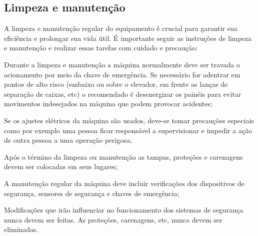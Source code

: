 \newpage
\thispagestyle{fancy}
\vspace*{40 pt}

\subsection{Limpeza e manutenção}

A limpeza e manutenção regular do equipamento é crucial para garantir sua eficiência e prolongar sua vida útil. É importante seguir as instruções de limpeza e manutenção e realizar essas tarefas com cuidado e precaução:

\begin{generalRulesForCleaning}
\item[\ding{\dingNumber}]  Durante a limpeza e manutenção a máquina normalmente deve ser travada o acionamento por meio da chave
de emergência. Se necessário for adentrar em pontos de alto risco (embaixo ou sobre o elevador, em frente as
lanças de separação de caixas, etc) o recomendado é desenergizar os painéis para evitar movimentos indesejados
na máquina que podem provocar acidentes;
\item[\ding{\dingNumber}] Se os ajustes elétricos da máquina são usados, deve-se tomar precauções especiais como por exemplo uma
pessoa ficar responsável a supervisionar e impedir a ação de outra pessoa a uma operação perigosa;
\item[\ding{\dingNumber}] Após o término da limpeza ou manutenção as tampas, proteções e carenagens devem ser colocadas em seus
lugares;
\item[\ding{\dingNumber}] A manutenção regular da máquina deve incluir verificações dos dispositivos de segurança, sensores de
segurança e chaves de emergência;
\item[\ding{\dingNumber}] Modificações que irão influenciar no funcionamento dos sistemas de segurança nunca devem ser feitas. As
proteções, carenagens, etc, nunca devem ser eliminadas.

\end{generalRulesForCleaning}

